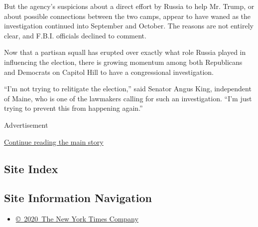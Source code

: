 But the agency's suspicions about a direct effort by Russia to help Mr.
Trump, or about possible connections between the two camps, appear to
have waned as the investigation continued into September and October.
The reasons are not entirely clear, and F.B.I. officials declined to
comment.

Now that a partisan squall has erupted over exactly what role Russia
played in influencing the election, there is growing momentum among both
Republicans and Democrats on Capitol Hill to have a congressional
investigation.

``I'm not trying to relitigate the election,'' said Senator Angus King,
independent of Maine, who is one of the lawmakers calling for such an
investigation. ``I'm just trying to prevent this from happening again.''

Advertisement

\protect\hyperlink{after-bottom}{Continue reading the main story}

\hypertarget{site-index}{%
\subsection{Site Index}\label{site-index}}

\hypertarget{site-information-navigation}{%
\subsection{Site Information
Navigation}\label{site-information-navigation}}

\begin{itemize}
\tightlist
\item
  \href{https://help.nytimes.com/hc/en-us/articles/115014792127-Copyright-notice}{©~2020~The
  New York Times Company}
\end{itemize}

